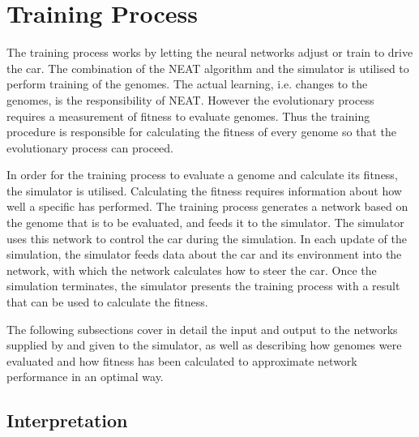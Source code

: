 \section{Training Process}
The training process works by letting the neural networks adjust or train to drive the car. The combination of the NEAT algorithm and the simulator is utilised to perform training of the genomes. The actual learning, i.e. changes to the genomes, is the responsibility of NEAT. However the evolutionary process requires a measurement of fitness to evaluate genomes. Thus the training procedure is responsible for calculating the fitness of every genome so that the evolutionary process can proceed. 

In order for the training process to evaluate a genome and calculate its fitness, the simulator is utilised. Calculating the fitness requires information about how well a specific has performed. The training process generates a network based on the genome that is to be evaluated, and feeds it to the simulator. The simulator uses this network to control the car during the simulation. In each update of the simulation, the simulator feeds data about the car and its environment into the network, with which the network calculates how to steer the car. Once the simulation terminates, the simulator presents the training process with a result that can be used to calculate the fitness.

The following subsections cover in detail the input and output to the networks supplied by and given to the simulator, as well as describing how genomes were evaluated and how fitness has been calculated to approximate network performance in an optimal way.

\subsection{Interpretation}

